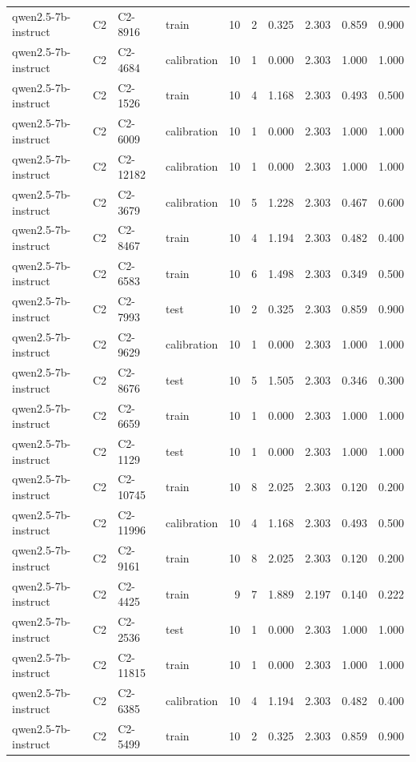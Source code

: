 \begin{table}
\begin{tabular}{llllrrrrrr}
qwen2.5-7b-instruct & C2 & C2-8916 & train & 10 & 2 & 0.325 & 2.303 & 0.859 & 0.900 \\
qwen2.5-7b-instruct & C2 & C2-4684 & calibration & 10 & 1 & 0.000 & 2.303 & 1.000 & 1.000 \\
qwen2.5-7b-instruct & C2 & C2-1526 & train & 10 & 4 & 1.168 & 2.303 & 0.493 & 0.500 \\
qwen2.5-7b-instruct & C2 & C2-6009 & calibration & 10 & 1 & 0.000 & 2.303 & 1.000 & 1.000 \\
qwen2.5-7b-instruct & C2 & C2-12182 & calibration & 10 & 1 & 0.000 & 2.303 & 1.000 & 1.000 \\
qwen2.5-7b-instruct & C2 & C2-3679 & calibration & 10 & 5 & 1.228 & 2.303 & 0.467 & 0.600 \\
qwen2.5-7b-instruct & C2 & C2-8467 & train & 10 & 4 & 1.194 & 2.303 & 0.482 & 0.400 \\
qwen2.5-7b-instruct & C2 & C2-6583 & train & 10 & 6 & 1.498 & 2.303 & 0.349 & 0.500 \\
qwen2.5-7b-instruct & C2 & C2-7993 & test & 10 & 2 & 0.325 & 2.303 & 0.859 & 0.900 \\
qwen2.5-7b-instruct & C2 & C2-9629 & calibration & 10 & 1 & 0.000 & 2.303 & 1.000 & 1.000 \\
qwen2.5-7b-instruct & C2 & C2-8676 & test & 10 & 5 & 1.505 & 2.303 & 0.346 & 0.300 \\
qwen2.5-7b-instruct & C2 & C2-6659 & train & 10 & 1 & 0.000 & 2.303 & 1.000 & 1.000 \\
qwen2.5-7b-instruct & C2 & C2-1129 & test & 10 & 1 & 0.000 & 2.303 & 1.000 & 1.000 \\
qwen2.5-7b-instruct & C2 & C2-10745 & train & 10 & 8 & 2.025 & 2.303 & 0.120 & 0.200 \\
qwen2.5-7b-instruct & C2 & C2-11996 & calibration & 10 & 4 & 1.168 & 2.303 & 0.493 & 0.500 \\
qwen2.5-7b-instruct & C2 & C2-9161 & train & 10 & 8 & 2.025 & 2.303 & 0.120 & 0.200 \\
qwen2.5-7b-instruct & C2 & C2-4425 & train & 9 & 7 & 1.889 & 2.197 & 0.140 & 0.222 \\
qwen2.5-7b-instruct & C2 & C2-2536 & test & 10 & 1 & 0.000 & 2.303 & 1.000 & 1.000 \\
qwen2.5-7b-instruct & C2 & C2-11815 & train & 10 & 1 & 0.000 & 2.303 & 1.000 & 1.000 \\
qwen2.5-7b-instruct & C2 & C2-6385 & calibration & 10 & 4 & 1.194 & 2.303 & 0.482 & 0.400 \\
qwen2.5-7b-instruct & C2 & C2-5499 & train & 10 & 2 & 0.325 & 2.303 & 0.859 & 0.900 \\

\end{tabular}
\end{table}

